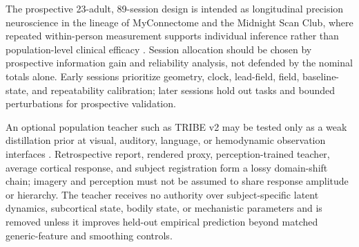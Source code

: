 The prospective 23-adult, 89-session design is intended as longitudinal
precision neuroscience in the lineage of MyConnectome and the Midnight Scan
Club, where repeated within-person measurement supports individual inference
rather than population-level clinical efficacy \citep{poldrack2015myconnectome,gordon2017msc}.
Session allocation should be chosen by prospective information gain and
reliability analysis, not defended by the nominal totals alone. Early sessions
prioritize geometry, clock, lead-field, field, baseline-state, and repeatability
calibration; later sessions hold out tasks and bounded perturbations for
prospective validation.

An optional population teacher such as TRIBE v2 may be tested only as a weak
distillation prior at visual, auditory, language, or hemodynamic observation
interfaces \citep{dascoli2026tribe}. Retrospective report, rendered proxy,
perception-trained teacher, average cortical response, and subject registration
form a lossy domain-shift chain; imagery and perception must not be assumed to
share response amplitude or hierarchy. The teacher receives no authority over
subject-specific latent dynamics, subcortical state, bodily state, or
mechanistic parameters and is removed unless it improves held-out empirical
prediction beyond matched generic-feature and smoothing controls.
